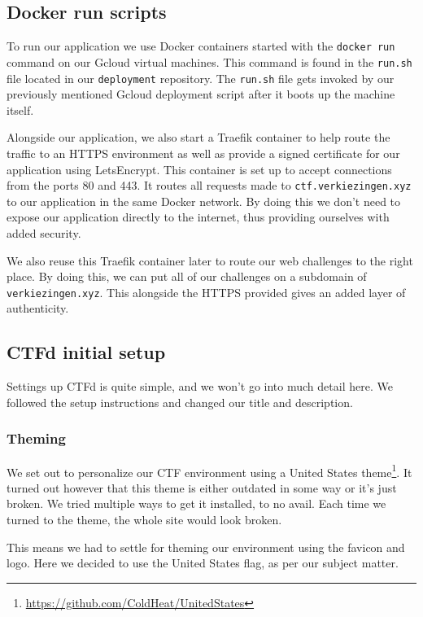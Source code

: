 \documentclass[../main.tex]{subfiles}
\begin{document}
\subsection{Docker run scripts}

To run our application we use Docker containers started with the \lstinline{docker run} command on our Gcloud virtual machines. This command is found in the \lstinline{run.sh} file located in our \lstinline{deployment} repository. The \lstinline{run.sh} file gets invoked by our previously mentioned Gcloud deployment script after it boots up the machine itself.

Alongside our application, we also start a Traefik container to help route the traffic to an HTTPS environment as well as provide a signed certificate for our application using LetsEncrypt. This container is set up to accept connections from the ports 80 and 443. It routes all requests made to \lstinline{ctf.verkiezingen.xyz} to our application in the same Docker network. By doing this we don't need to expose our application directly to the internet, thus providing ourselves with added security.

We also reuse this Traefik container later to route our web challenges to the right place. By doing this, we can put all of our challenges on a subdomain of \lstinline{verkiezingen.xyz}. This alongside the HTTPS provided gives an added layer of authenticity.

\subsection{CTFd initial setup}

Settings up CTFd is quite simple, and we won't go into much detail here. We followed the setup instructions and changed our title and description.

\subsubsection{Theming}

We set out to personalize our CTF environment using a United States theme\footnote{\url{https://github.com/ColdHeat/UnitedStates}}. It turned out however that this theme is either outdated in some way or it's just broken. We tried multiple ways to get it installed, to no avail. Each time we turned to the theme, the whole site would look broken.

This means we had to settle for theming our environment using the favicon and logo. Here we decided to use the United States flag, as per our subject matter.
\end{document}
